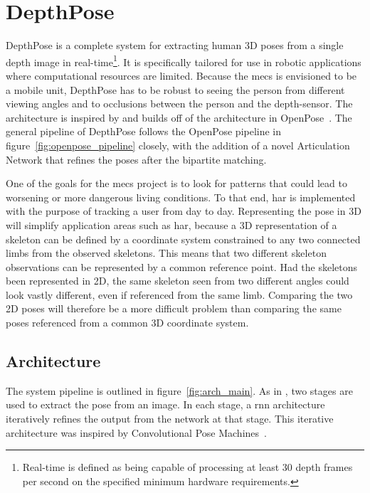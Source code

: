 \chapter{DepthPose}

DepthPose is a complete system for extracting human 3D poses from a single depth image in real-time\footnote{Real-time is defined as being capable of processing at least 30 depth frames per second on the specified minimum hardware requirements.}. It is specifically tailored for use in robotic applications where computational resources are limited. Because the \gls{mecs} is envisioned to be a mobile unit, DepthPose has to be robust to seeing the person from different viewing angles and to occlusions between the person and the depth-sensor. The architecture is inspired by and builds off of the architecture in OpenPose~\cite{cao2019openpose}. The general pipeline of DepthPose follows the OpenPose pipeline in figure~\ref{fig:openpose_pipeline} closely, with the addition of a novel Articulation Network that refines the poses after the bipartite matching.

One of the goals for the \gls{mecs} project is to look for patterns that could lead to worsening or more dangerous living conditions. To that end, \gls{har} is implemented with the purpose of tracking a user from day to day. Representing the pose in 3D will simplify application areas such as \gls{har}, because a 3D representation of a skeleton can be defined by a coordinate system constrained to any two connected limbs from the observed skeletons. This means that two different skeleton observations can be represented by a common reference point. Had the skeletons been represented in 2D, the same skeleton seen from two different angles could look vastly different, even if referenced from the same limb. Comparing the two 2D poses will therefore be a more difficult problem than comparing the same poses referenced from a common 3D coordinate system.



\section{Architecture}

The system pipeline is outlined in figure~\ref{fig:arch_main}. As in \cite{cao2019openpose}, two stages are used to extract the pose from an image. In each stage, a \gls{rnn} architecture iteratively refines the output from the network at that stage. This iterative architecture was inspired by Convolutional Pose Machines~\cite{wei2016cpm}.

